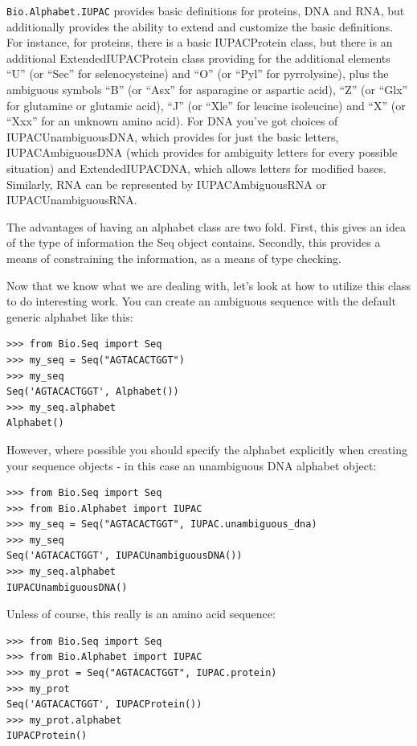 \documentclass{report}
\begin{document}
\verb|Bio.Alphabet.IUPAC| provides basic definitions for proteins, DNA and RNA, but additionally provides the ability to extend and customize the basic definitions. For instance, for proteins, there is a basic IUPACProtein class, but there is an additional ExtendedIUPACProtein class providing for the additional elements ``U'' (or ``Sec'' for selenocysteine) and ``O'' (or ``Pyl'' for pyrrolysine), plus the ambiguous symbols ``B'' (or ``Asx'' for asparagine or aspartic acid), ``Z'' (or ``Glx'' for glutamine or glutamic acid), ``J'' (or ``Xle'' for leucine isoleucine) and ``X'' (or ``Xxx'' for an unknown amino acid). For DNA you've got choices of IUPACUnambiguousDNA, which provides for just the basic letters, IUPACAmbiguousDNA (which provides for ambiguity letters for every possible situation) and ExtendedIUPACDNA, which allows letters for modified bases. Similarly, RNA can be represented by IUPACAmbiguousRNA or IUPACUnambiguousRNA.

The advantages of having an alphabet class are two fold. First, this gives an idea of the type of information the Seq object contains. Secondly, this provides a means of constraining the information, as a means of type checking.

Now that we know what we are dealing with, let's look at how to utilize this class to do interesting work.
You can create an ambiguous sequence with the default generic alphabet like this:

\begin{verbatim}
>>> from Bio.Seq import Seq
>>> my_seq = Seq("AGTACACTGGT")
>>> my_seq
Seq('AGTACACTGGT', Alphabet())
>>> my_seq.alphabet
Alphabet()
\end{verbatim}

However, where possible you should specify the alphabet explicitly when creating your sequence objects - in this case an unambiguous DNA alphabet object:

\begin{verbatim}
>>> from Bio.Seq import Seq
>>> from Bio.Alphabet import IUPAC
>>> my_seq = Seq("AGTACACTGGT", IUPAC.unambiguous_dna)
>>> my_seq
Seq('AGTACACTGGT', IUPACUnambiguousDNA())
>>> my_seq.alphabet
IUPACUnambiguousDNA()
\end{verbatim}

Unless of course, this really is an amino acid sequence:

\begin{verbatim}
>>> from Bio.Seq import Seq
>>> from Bio.Alphabet import IUPAC
>>> my_prot = Seq("AGTACACTGGT", IUPAC.protein)
>>> my_prot
Seq('AGTACACTGGT', IUPACProtein())
>>> my_prot.alphabet
IUPACProtein()
\end{verbatim}
\end{document}
